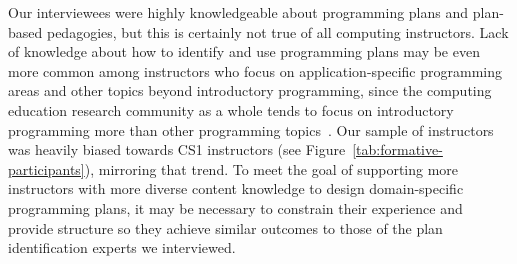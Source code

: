 Our interviewees were highly knowledgeable about programming plans and plan-based pedagogies, but this is certainly not true of all computing instructors. Lack of knowledge about how to identify and use programming plans may be even more common among instructors who focus on application-specific programming areas and other topics beyond introductory programming, since the computing education research community as a whole tends to focus on introductory programming more than other programming topics~\cite{Noa_SIGCSE-focus-topics_2019}. Our sample of instructors was heavily biased towards CS1 instructors (see Figure~\ref{tab:formative-participants}), mirroring that trend. To meet the goal of supporting more instructors with more diverse content knowledge to design domain-specific programming plans, it may be necessary to constrain their experience and provide structure so they achieve similar outcomes to those of the plan identification experts we interviewed.
















